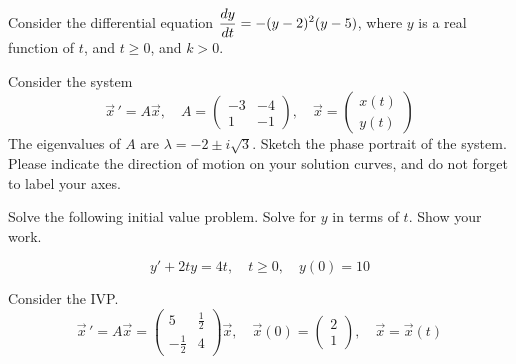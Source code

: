 \documentclass[12pt]{exam}
\begin{document}
\begin{questions}
    \newpage 
    
    \question[10] %
    Consider the differential equation $\displaystyle {\frac{dy}{dt}} = - (y-2)^2(y-5)$, where $y$ is a real function of $t$, and $t \ge 0$, and $k>0$. 
    
    
    \newpage \Initials
    
    \question[3]  Consider the system $$\vec x \, ' = A\vec x, \quad A = \begin{pmatrix} -3&-4\\1&-1 \end{pmatrix}, \quad \vec x = \begin{pmatrix} x(t)\\y(t)\end{pmatrix} $$ The eigenvalues of $A$ are $\lambda = -2\pm i\sqrt 3$. Sketch the phase portrait of the system. Please indicate the direction of motion on your solution curves, and do not forget to label your axes.     
    
    \vspace{5cm}
    
    \question[6] Solve the following initial value problem. Solve for $y$ in terms of $t$. Show your work. 
    
    $$y' + 2ty = 4t, \quad t \ge 0, \quad y(0) = 10$$

    


    \newpage \Initials
    
    \question[10] Consider the IVP. $$\vec x \, ' = A \vec x =  \begin{pmatrix} 5&\frac12\\-\frac12&4 \end{pmatrix} \vec x, \quad \vec x(0) = \begin{pmatrix} 2 \\1 \end{pmatrix}, \quad \vec x = \vec x(t)$$
 	

\end{questions}
\end{document}
